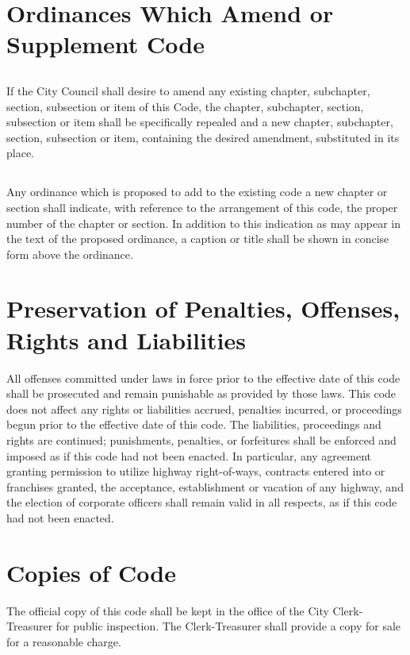 \section{Ordinances Which Amend or Supplement Code}
\subsection{}
If the City Council shall desire to amend any existing chapter, subchapter, section, subsection or item of this Code, the chapter, subchapter, section, subsection or item shall be specifically repealed and a new chapter, subchapter, section, subsection or item, containing the desired amendment, substituted in its place.
\subsection{}
Any ordinance which is proposed to add to the existing code a new chapter or section shall indicate, with reference to the arrangement of this code, the proper number of the chapter or section. In addition to this indication as may appear in the text of the proposed ordinance, a caption or title shall be shown in concise form above the ordinance.



\section{Preservation of Penalties, Offenses, Rights and Liabilities}
All offenses committed under laws in force prior to the effective date of this code shall be prosecuted and remain punishable as provided by those laws.  This code does not affect any rights or liabilities accrued, penalties incurred, or proceedings begun prior to the effective date of this code.  The liabilities, proceedings and rights are continued; punishments, penalties, or forfeitures shall be enforced and imposed as if this code had not been enacted.  In particular, any agreement granting permission to utilize highway right-of-ways, contracts entered into or franchises granted, the acceptance, establishment or vacation of any highway, and the election of corporate officers shall remain valid in all respects, as if this code had not been enacted.



\section{Copies of Code}
The official copy of this code shall be kept in the office of the City Clerk-Treasurer for public inspection.  The Clerk-Treasurer shall provide a copy for sale for a reasonable charge.



